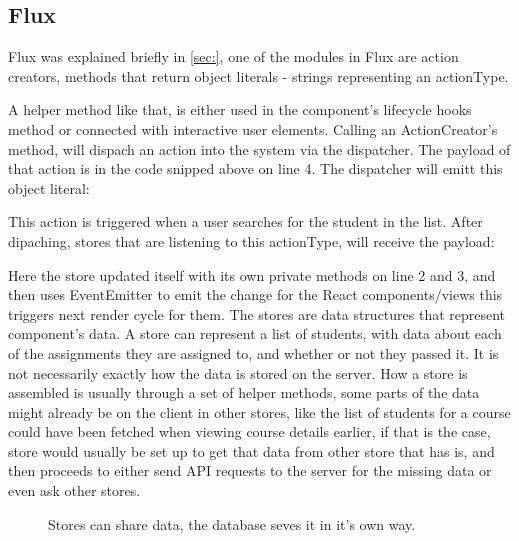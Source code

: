 \subsection{Flux}\label{sec:fluximplementation}
Flux was explained briefly in \ref{sec:}, one of the modules in Flux are action creators, methods that return object literals - strings representing an actionType.

A helper method like that, is either used in the component's lifecycle hooks method or connected with interactive user elements. Calling an ActionCreator's method, will dispach an action into the system via the dispatcher. The payload of that action is in the code snipped above on line 4. The dispatcher will emitt this object literal:

This action is triggered when a user searches for the student in the list. After dipaching, stores that are listening to this actionType, will receive the payload:

Here the store updated itself with its own private methods on line 2 and 3, and then uses EventEmitter to emit the change for the React components/views this triggers next render cycle for them.
The stores are data structures that represent component's data. A store can represent a list of students, with data about each of the assignments they are assigned to, and whether or not they passed it. It is not necessarily exactly how the data is stored on the server. How a store is assembled is usually through a set of helper methods, some parts of the data might already be on the client in other stores, like the list of students for a course could have been fetched when viewing course details earlier, if that is the case, store would usually be set up to get that data from other store that has is, and then proceeds to either send API requests to the server for the missing data or even ask other stores.

\begin{figure}[h]
\centering
\scalebox{1}{{}}
\caption{Stores can share data, the database seves it in it's own way.}
\end{figure}

